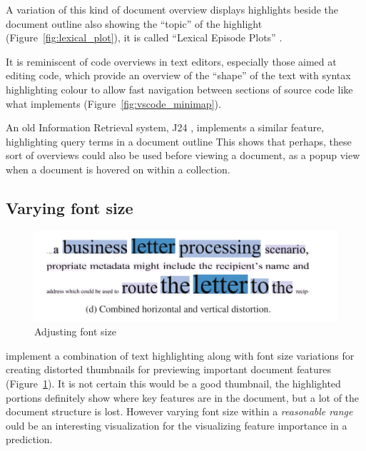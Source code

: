 \documentclass[\version]{l4proj}
\begin{document}
A variation of this kind of document overview displays highlights beside the document outline also showing the ``topic'' of the highlight (Figure~\ref{fig:lexical_plot}), it is called ``Lexical Episode Plots'' \autocite{el-assadyVisArgueVisualText2016,goldExploratoryTextAnalysis2015}.

It is reminiscent of code overviews in text editors, especially those aimed at editing code, which provide an overview of the ``shape'' of the text with syntax highlighting colour to allow fast navigation between sections of source code like what \textcite{MicrosoftVscode2020} implements (Figure~\ref{fig:vscode_minimap}).

An old Information Retrieval system, J24 \autocite[7]{ogdenDocumentThumbnailVisualizations1998}, implements a similar feature, highlighting query terms in a document outline
This shows that perhaps, these sort of overviews could also be used before viewing a document, as a popup view when a document is hovered on within a collection.

\subsection{Varying font size}

\begin{figure}
    \includegraphics[width=\linewidth]{images/document_visualization/font-size.png}
    \caption{Adjusting font size}\label{fig:font-size}
    \vspace{-10pt}
\end{figure}

\textcite{stoffelDocumentThumbnailsVariable2012} implement a combination of text highlighting along with font size variations for creating distorted thumbnails for previewing important document features (Figure~\ref{fig:font-size}).
It is not certain this would be a good thumbnail, the highlighted portions definitely show where key features are in the document, but a lot of the document structure is lost.
However varying font size within a \textit{reasonable range} ould be an interesting visualization for the visualizing feature importance in a prediction.
\end{document}
